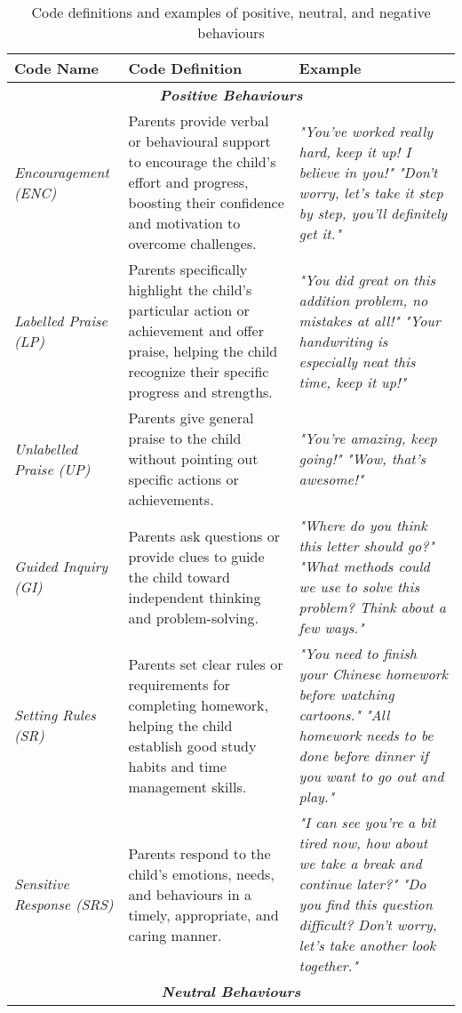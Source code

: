 \begin{table}
\centering
\scriptsize
\caption{Code definitions and examples of positive, neutral, and negative behaviours}
\label{tab:behaviours} 
\begin{tabular}{p{} p{} p{}}
\toprule
\textbf{Code Name} & \textbf{Code Definition} & \textbf{Example} \\ \midrule
\multicolumn{3}{c}{\textbf{\textit{Positive Behaviours}}}   \\\midrule
\textit{Encouragement (ENC)} & Parents provide verbal or behavioural support to encourage the child's effort and progress, boosting their confidence and motivation to overcome challenges. & \textit{"You've worked really hard, keep it up! I believe in you!"} \newline \textit{"Don't worry, let's take it step by step, you'll definitely get it."} \\ \hline
\textit{Labelled Praise (LP)} & Parents specifically highlight the child's particular action or achievement and offer praise, helping the child recognize their specific progress and strengths. & \textit{"You did great on this addition problem, no mistakes at all!"} \newline \textit{"Your handwriting is especially neat this time, keep it up!"} \\ \hline
\textit{Unlabelled \newline Praise (UP)} & Parents give general praise to the child without pointing out specific actions or achievements. & \textit{"You're amazing, keep going!"} \newline \textit{"Wow, that's awesome!"} \\ \hline
\textit{Guided \newline Inquiry (GI)} & Parents ask questions or provide clues to guide the child toward independent thinking and problem-solving. & \textit{"Where do you think this letter should go?"} \newline \textit{"What methods could we use to solve this problem? Think about a few ways."} \\ \hline
\textit{Setting Rules (SR)} & Parents set clear rules or requirements for completing homework, helping the child establish good study habits and time management skills. & \textit{"You need to finish your Chinese homework before watching cartoons."} \newline \textit{"All homework needs to be done before dinner if you want to go out and play."} \\ \hline
\textit{Sensitive \newline Response (SRS)} & Parents respond to the child's emotions, needs, and behaviours in a timely, appropriate, and caring manner. & \textit{"I can see you're a bit tired now, how about we take a break and continue later?"} \newline \textit{"Do you find this question difficult? Don't worry, let's take another look together."} \\ \midrule
\multicolumn{3}{c}{\textbf{\textit{Neutral Behaviours}}}   \\\midrule


\end{tabular}
\end{table}
